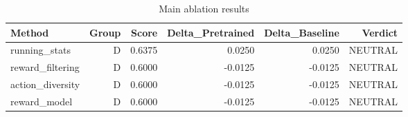\begin{table}[htbp]
\centering
\caption{Main ablation results}
\label{tab:main-results}
\begin{tabular}{lrrrrr}
\toprule
\textbf{Method} & \textbf{Group} & \textbf{Score} & \textbf{Delta\_Pretrained} & \textbf{Delta\_Baseline} & \textbf{Verdict} \\
\midrule
running\_stats & D & 0.6375 & 0.0250 & 0.0250 & NEUTRAL \\
reward\_filtering & D & 0.6000 & -0.0125 & -0.0125 & NEUTRAL \\
action\_diversity & D & 0.6000 & -0.0125 & -0.0125 & NEUTRAL \\
reward\_model & D & 0.6000 & -0.0125 & -0.0125 & NEUTRAL \\
\bottomrule
\end{tabular}
\end{table}